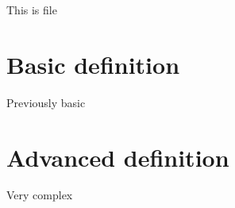\documentclass{ximera}
\begin{document}
    \author{Wim Obbels}
    \label{xim:references}


This is file \currfilename

\section{Basic definition}\label{sec:basicdefinition2}

\begin{definition}\label{def:basicdefinition2}
Previously basic
\end{definition}

\section{Advanced definition}\label{sec:advanceddefinition2}

\begin{definition}\label{def:advanceddefinition2}
Very complex
\end{definition}
\end{document}
